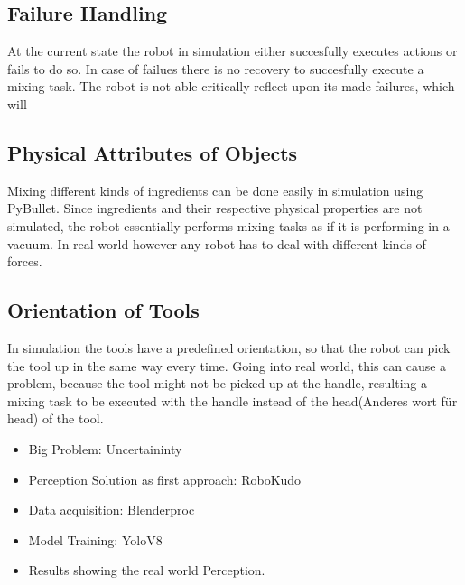 \subsection{Failure Handling}
At the current state the robot in simulation either succesfully executes actions or fails to do so.
In case of failues there is no recovery to succesfully execute a mixing task. The robot is not able critically 
reflect upon its made failures, which will 

\subsection{Physical Attributes of Objects}
Mixing different kinds of ingredients can be done easily in simulation using PyBullet. Since ingredients and their 
respective physical properties are not simulated, the robot essentially performs mixing tasks as if it is performing in 
a vacuum. In real world however any robot has to deal with different kinds of forces.

\subsection{Orientation of Tools}
In simulation the tools have a predefined orientation, so that the robot can pick the tool up in the same way every time.
Going into real world, this can cause a problem, because the tool might not be picked up at the handle, resulting 
a mixing task to be executed with the handle instead of the head(Anderes wort für head) of the tool.



\begin{itemize}
	\item Big Problem: Uncertaininty
	\item Perception Solution as first approach: RoboKudo
	\item Data acquisition: Blenderproc
	\item Model Training: YoloV8
	\item Results showing the real world Perception.
\end{itemize}